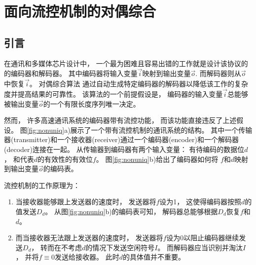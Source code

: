 \chapter{面向流控机制的对偶综合}
\label{chap:4}

%
%

\section{ 引言}

在通讯和多媒体芯片设计中，
一个最为困难且容易出错的工作就是设计该协议的的编码器和解码器。
其中编码器将输入变量$\vec{i}$映射到输出变量$\vec{o}$.
而解码器则从$\vec{o}$中恢复$\vec{i}$。
对偶综合算法
通过自动生成特定编码器的解码器以降低该工作的复杂度并提高结果的可靠性。
该算法的一个前提假设是，
编码器的输入变量$\vec{i}$总能够被输出变量$\vec{o}$的一个有限长度序列唯一决定。

然而，
许多高速通讯系统的编码器带有流控功能，
而该功能直接违反了上述假设。
图\ref{fig:nonuniq}a)展示了一个带有流控机制的通讯系统的结构。
其中一个传输器(transmitter)和一个接收器(receiver)通过一个编码器(encoder)和一个解码器(decoder)连接在一起。
从传输器到编码器有两个输入变量：
有待编码的数据位$d$，
和代表$d$的有效性的有效位$f$。
图\ref{fig:nonuniq}b)给出了编码器如何将
$f$和$d$映射到输出变量$\vec{o}$的编码表。

流控机制的工作原理为：
\begin{enumerate}
\item
当接收器能够跟上发送器的速度时，
发送器将$f$设为1，
这使得编码器按照$d$的值发送$D_d$。
从图\ref{fig:nonuniq}b)的编码表可知，
解码器总能够根据$D_d$恢复$f$和$d$。
\item
而当接收器无法跟上发送器的速度时，
发送器将$f$设为0以阻止编码器继续发送$D_d$，
转而在不考虑$d$的情况下发送空闲符号$I$。
而解码器应当识别并淘汰$I$，
并将$f\equiv 0$发送给接收器。
此时$d$的具体值并不重要。
\end{enumerate}

